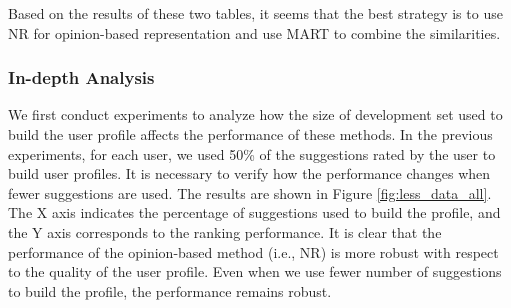 Based on the results of these two tables, it seems that the best 
strategy is to use NR for opinion-based representation and use MART 
to combine the similarities.

\subsubsection{In-depth Analysis}
\label{sec:analysis}

We first conduct experiments to analyze how the size of development set 
used to build the user profile affects the performance of these methods. 
In the previous experiments, for each user, we used 50\% of the suggestions 
rated by the user to build user profiles. 
It is necessary to verify how the performance changes when fewer 
suggestions are used. The results are shown in Figure \ref{fig:less_data_all}. 
The X axis indicates the percentage of suggestions used to build the profile, 
and the Y axis corresponds to the ranking performance. 
It is clear that the performance of the opinion-based method (i.e., NR) 
is more robust with respect to the quality of the user profile.
Even when we use fewer number of suggestions to build the profile, 
the performance remains robust.

